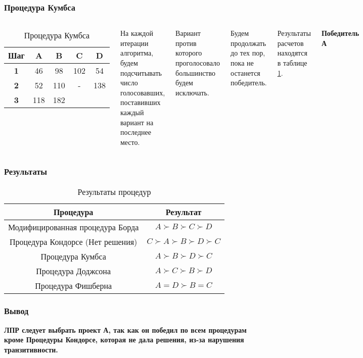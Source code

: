 \documentclass[10pt]{beamer}
\begin{document}
\begin{frame}
  \frametitle{Процедура Кумбса}
  \begin{columns}
  \begin{table}
    \caption{Процедура Кумбса}
    \label{t5}
    \begin{tabular}{|c|c|c|c|c|}
      \hline
      \textbf{Шаг} & \textbf{A} &\textbf{B} &\textbf{C} &\textbf{D}\\
      \hline
      \textbf{1} &	46  & 98  & \cellcolor{yellow}102 & 54\\
      \textbf{2} &	52  & 110 & -   & \cellcolor{yellow}138\\
      \textbf{3} &	118 & \cellcolor{yellow}182 &     &\\
      \hline
    \end{tabular}
  \end{table}

  На каждой итерации алгоритма, будем подсчитывать число голосовавших, поставивших каждый вариант на последнее место.

Вариант против которого проголосовало большинство будем исключать.

Будем продолжать до тех пор, пока не останется победитель.

Результаты расчетов находятся в таблице \ref{t5}.

\textbf{Победитель  А}
\end{columns}
\end{frame}

\begin{frame}
  \frametitle{Результаты}
  \begin{table}
    \caption{Результаты процедур}
    \label{t6}
    \begin{tabular}{|c|c|}
      \hline
      \textbf{Процедура} & \textbf{Результат}\\
      \hline
      Модифицированная процедура Борда & $A \succ B \succ C \succ D$\\
      Процедура Кондорсе (Нет решения)	&   $C \succ A \succ B \succ D \succ C$ \\
      Процедура Кумбса	  & $A \succ B \succ D \succ C$\\
      Процедура Доджсона	& $A \succ C \succ B \succ D$\\
      Процедура Фишберна	& $A = D \succ B =C $\\
      \hline
    \end{tabular}
  \end{table}
\end{frame}

\begin{frame}
  \frametitle{Вывод}
  \textbf{ЛПР следует выбрать проект А, так как он победил по всем процедурам кроме Процедуры Кондорсе, которая не дала решения, из-за нарушения транзитивности.}

\end{frame}
\end{document}
